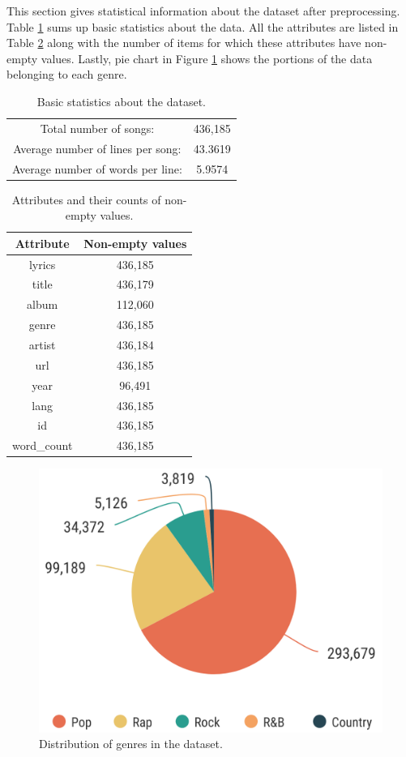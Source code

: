 This section gives statistical information about the dataset after preprocessing. Table \ref{basic_stats} sums up basic statistics about the data. All the attributes are listed in Table \ref{stats_nonempty_values} along with the number of items for which these attributes have non-empty values. Lastly, pie chart in Figure \ref{piechart_genres} shows the portions of the data belonging to each genre. 
\begin{table}[h!]
	\centering
	\begin{tabular}{c c} 
		Total number of songs: & 436,185\\ 
		Average number of lines per song: & 43.3619 \\
		Average number of words per line: & 5.9574 \\
	\end{tabular}
	\caption{Basic statistics about the dataset.}
	\label{basic_stats}
\end{table}

\begin{table}[h!]
	\centering
	\begin{tabular}{| c | c |} 
		\hline
		Attribute & Non-empty values \\ [0.5ex] 
		\hline
		lyrics & 436,185 \\
		title & 436,179 \\
		album & 112,060 \\
		genre & 436,185 \\ 
		artist & 436,184 \\ 
		url & 436,185 \\
		year & 96,491 \\ 
		lang & 436,185 \\
		id & 436,185 \\
		word\_count & 436,185 \\
		\hline
	\end{tabular}
	\caption{Attributes and their counts of non-empty values.}
	\label{stats_nonempty_values}
\end{table}


\begin{figure}[h]\centering
	\includegraphics[scale=0.25]{../img/piechart_genres.png}
	\caption{Distribution of genres in the dataset.}\label{piechart_genres}
\end{figure}



